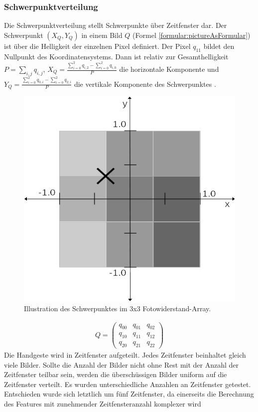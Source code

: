 \subsubsection{Schwerpunktverteilung}
\label{sec:schwerpunktverteilung}
Die Schwerpunktverteilung stellt Schwerpunkte über Zeitfenster dar. Der Schwerpunkt $(X_Q, Y_Q)$ in einem Bild $Q$ (Formel \ref{formular:pictureAsFormular}) ist über die Helligkeit der einzelnen
Pixel definiert. Der Pixel $q_{11}$ bildet den Nullpunkt des Koordinatensystems. Dann ist relativ zur Gesamthelligkeit $P = \sum_{i,j} q_{i,j}$, $X_Q=\frac{\sum_{i=0}^{2} q_{i,2} - \sum_{i=0}^{2} q_{i,0}}{P}$
die horizontale Komponente und $Y_Q = \frac{\sum_{i=0}^{2} q_{0,i} - \sum_{i=0}^{2} q_{2,i}}{P}$ die vertikale Komponente des Schwerpunktes \cite{schwerpunktAnsatz}.
\begin{figure}
    \centering
    \includegraphics[width=0.5\linewidth]{images/schwerpunkt_ansatz.jpg}
    \caption{Illustration des Schwerpunktes im 3x3 Fotowiderstand-Array.}
    \label{fig:schwerpunkt}
\end{figure}
\begin{align}
    Q = \begin{pmatrix}
            q_{00} & q_{01} & q_{02} \\
            q_{10} & q_{11} & q_{12} \\
            q_{20} & q_{21} & q_{22}
    \end{pmatrix}
    \label{formular:pictureAsFormular}
\end{align}
Die Handgeste wird in Zeitfenster aufgeteilt. Jedes Zeitfenster beinhaltet gleich viele Bilder. Sollte die Anzahl der Bilder nicht ohne Rest mit der Anzahl der Zeitfenster teilbar sein, werden die
überschüssigen Bilder uniform auf die Zeitfenster verteilt.
\newline
\newline
Es wurden unterschiedliche Anzahlen an Zeitfenster getestet. Entschieden wurde sich letztlich um fünf Zeitfenster, da einerseits die Berechnung des Features mit zunehmender Zeitfensteranzahl komplexer wird
